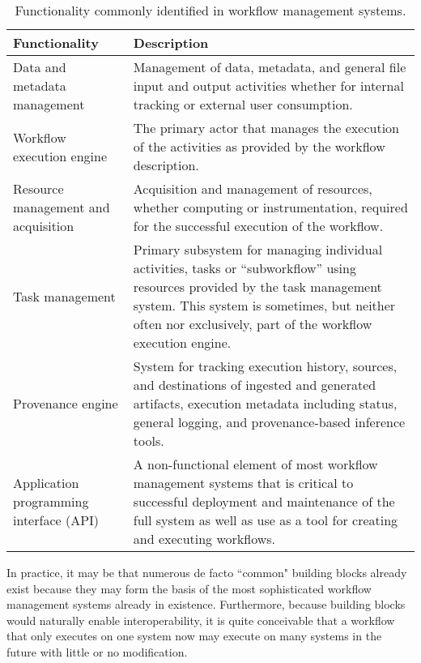 \begin{table*}[h]
\begin{tabu} to \textwidth {|X[l]|X[l]|} \hline
\textbf{Functionality} & \textbf{Description} \tabularnewline\hline Data and
metadata management & Management of data, metadata, and general file input and
output activities whether for internal tracking or external user
consumption. \\ \hline 
Workflow execution engine & The primary
actor that manages the execution of the activities as provided by the workflow
description. \tabularnewline\hline 
Resource management and acquisition &
Acquisition and management of resources, whether computing or instrumentation,
required for the successful execution of the workflow. \tabularnewline\hline
Task management & Primary subsystem for managing individual activities, tasks or
``subworkflow'' using resources provided by the task management system. This
system is sometimes, but neither often nor exclusively, part of the workflow
execution engine. \tabularnewline\hline 
Provenance engine & System for tracking
execution history, sources, and destinations of ingested and generated artifacts,
execution metadata including status, general logging, and provenance-based
inference tools. \tabularnewline\hline 
Application programming interface (API) &
A non-functional element of most workflow management systems that is critical to
successful deployment and maintenance of the full system as well as use
as a tool for creating and executing workflows. \tabularnewline\hline
\end{tabu} 
\caption{Functionality commonly identified in workflow management
systems.} 
\label{blocks}
\end{table*}

In practice, it may be that numerous de facto ``common" building blocks
already exist because they may form the basis of the most sophisticated
workflow management systems already in existence. Furthermore, because building
blocks would naturally enable interoperability, it is quite conceivable that a
workflow that only executes on one system now may execute on many systems in
the future with little or no modification.

